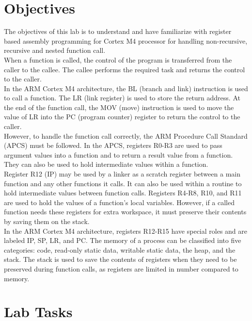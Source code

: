 \documentclass[11pt]{article}
\begin{document}
\newpage
\section{Objectives}
The objectives of this lab is to understand and have familiarize with register based assembly programming for Cortex M4 processor for handling non-recursive, recursive and nested function call.  \\[10pt]

When a function is called, the control of the program is transferred from the caller to the callee. The callee performs the required task and returns the control to the caller.  \\[10pt]

In the ARM Cortex M4 architecture, the BL (branch and link) instruction is used to call a function. The LR (link register) is used to store the return address. At the end of the function call, the MOV (move) instruction is used to move the value of LR into the PC (program counter) register to return the control to the caller.  \\[10pt]

However, to handle the function call correctly, the ARM Procedure Call Standard (APCS) must be followed. In the APCS, registers R0-R3 are used to pass argument values into a function and to return a result value from a function. They can also be used to hold intermediate values within a function.  \\[10pt]

Register R12 (IP) may be used by a linker as a scratch register between a main function and any other functions it calls. It can also be used within a routine to hold intermediate values between function calls. Registers R4-R8, R10, and R11 are used to hold the values of a function's local variables. However, if a called function needs these registers for extra workspace, it must preserve their contents by saving them on the stack. \\[10pt]

In the ARM Cortex M4 architecture, registers R12-R15 have special roles and are labeled IP, SP, LR, and PC. The memory of a process can be classified into five categories: code, read-only static data, writable static data, the heap, and the stack. The stack is used to save the contents of registers when they need to be preserved during function calls, as registers are limited in number compared to memory.  \\[10pt]
\section{Lab Tasks}
\end{document}
